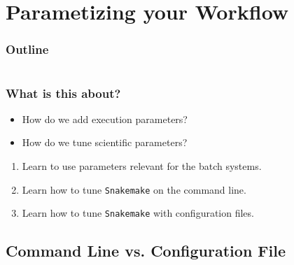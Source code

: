 \section{Parametizing your Workflow}

\begin{frame}
    \frametitle{Outline}
    \begin{columns}[t]
        \begin{column}{.5\textwidth}
            \tableofcontents[sections={1-9},currentsection]
        \end{column}
        \begin{column}{.5\textwidth}
            \tableofcontents[sections={10-18},currentsection]
        \end{column}
    \end{columns}
\end{frame}

\begin{frame}
  \frametitle{What is this about?}
   \begin{question}[Questions]
   	 \begin{itemize}
        \item How do we add execution parameters?
        \item How do we tune scientific parameters?
     \end{itemize}
   \end{question}
   \begin{docs}[Objectives]
   	 \begin{enumerate} 
                      \item Learn to use parameters relevant for the batch systems.
                      \item Learn how to tune \texttt{Snakemake} on the command line.
                      \item Learn how to tune \texttt{Snakemake} with configuration files.
     \end{enumerate}
   \end{docs}
\end{frame}

\subsection{Command Line vs. Configuration File}

